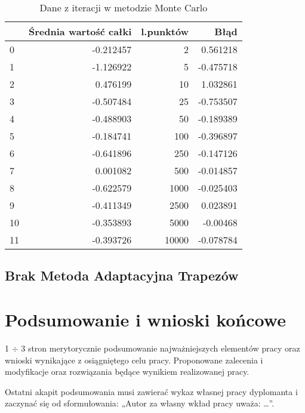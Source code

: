 \documentclass[12pt,twoside]{article}
\begin{document}
\begin{table}[H]
\centering 
\caption{Dane z iteracji w metodzie Monte Carlo}
\label{tabela7.3}
\begin{tabular}{lrrr}
\toprule
{} &  Średnia wartość całki &  l.punktów &       Błąd \\
\midrule
0  &              -0.212457 &          2 &  0.561218 \\
1  &              -1.126922 &          5 & -0.475718 \\
2  &               0.476199 &         10 &  1.032861 \\
3  &              -0.507484 &         25 & -0.753507 \\
4  &              -0.488903 &         50 & -0.189389 \\
5  &              -0.184741 &        100 & -0.396897 \\
6  &              -0.641896 &        250 & -0.147126 \\
7  &               0.001082 &        500 & -0.014857 \\
8  &              -0.622579 &       1000 & -0.025403 \\
9  &              -0.411349 &       2500 &  0.023891 \\
10 &              -0.353893 &       5000 & -0.00468 \\
11 &              -0.393726 &      10000 & -0.078784 \\
\bottomrule
\end{tabular}
\end{table}


\subsection{Brak Metoda Adaptacyjna Trapezów}


\section{Podsumowanie i wnioski końcowe}

1 $\div$ 3 stron merytorycznie podsumowanie najważniejszych elementów pracy oraz wnioski wynikające z osiągniętego celu pracy. Proponowane zalecenia i modyfikacje oraz rozwiązania będące wynikiem realizowanej pracy.

Ostatni akapit podsumowania musi zawierać wykaz własnej pracy dyplomanta i zaczynać się od sformułowania: „Autor za własny wkład pracy uważa: \ldots”.

\clearpage
\end{document}
